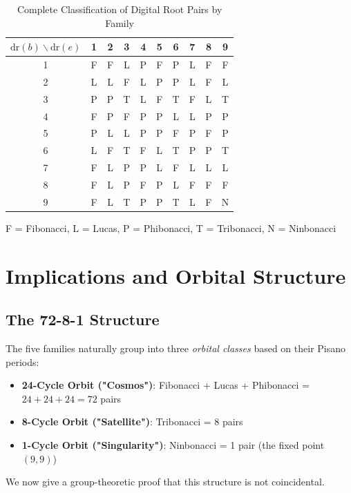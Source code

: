 \documentclass[12pt]{article}
\begin{document}
\begin{table}[h!]
\centering
\caption{Complete Classification of Digital Root Pairs by Family}
\label{tab:classification}
\small
\begin{tabular}{c|ccccccccc}
\toprule
$\text{dr}(b) \backslash \text{dr}(e)$ & 1 & 2 & 3 & 4 & 5 & 6 & 7 & 8 & 9 \\
\midrule
1 & F & F & L & P & F & P & L & F & F \\
2 & L & L & F & L & P & P & L & F & L \\
3 & P & P & T & L & F & T & F & L & T \\
4 & F & P & F & P & P & L & L & P & P \\
5 & P & L & L & P & P & F & P & F & P \\
6 & L & F & T & F & L & T & P & P & T \\
7 & F & L & P & P & L & F & L & L & L \\
8 & F & L & P & F & P & L & F & F & F \\
9 & F & L & T & P & P & T & L & F & N \\
\bottomrule
\end{tabular}

\vspace{0.2cm}
\small{F = Fibonacci, L = Lucas, P = Phibonacci, T = Tribonacci, N = Ninbonacci}
\end{table}

\section{Implications and Orbital Structure}

\subsection{The 72-8-1 Structure}

The five families naturally group into three \emph{orbital classes} based on their Pisano periods:

\begin{itemize}
\item \textbf{24-Cycle Orbit ("Cosmos")}: Fibonacci + Lucas + Phibonacci = $24 + 24 + 24 = 72$ pairs
\item \textbf{8-Cycle Orbit ("Satellite")}: Tribonacci = 8 pairs
\item \textbf{1-Cycle Orbit ("Singularity")}: Ninbonacci = 1 pair (the fixed point $(9,9)$)
\end{itemize}

We now give a group-theoretic proof that this structure is not coincidental.
\end{document}
